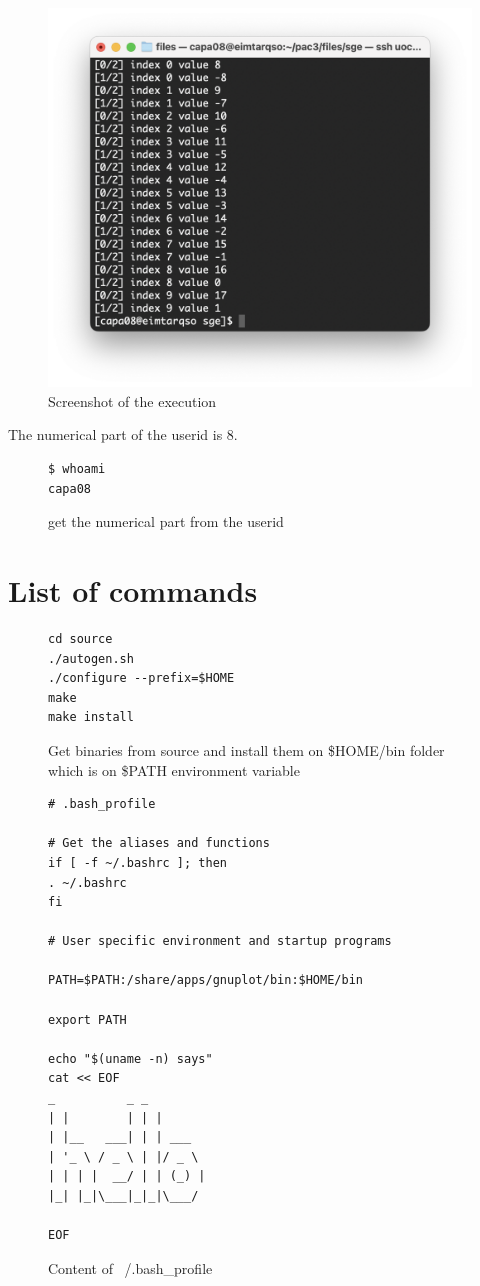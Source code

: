 \documentclass[12pt]{article}
\begin{document}
\begin{figure}[h!]
	\centering
	\includegraphics[width=0.6\linewidth]{images/Q4.png}
	\caption{Screenshot of the execution}
	\label{fig:scr04}
\end{figure}

The numerical part of the userid is 8.

\begin{figure}[h!]
	\begin{verbatim}
$ whoami 
capa08
	\end{verbatim}
	\caption{get the numerical part from the userid}\label{code:user}
\end{figure}

\newpage

\section*{List of commands}

\begin{figure}[h!]
	\begin{verbatim}
cd source
./autogen.sh 
./configure --prefix=$HOME
make
make install
	\end{verbatim}
	\caption{Get binaries from source and install them on \$HOME/bin folder which is on \$PATH environment variable}\label{code:build}
\end{figure}

\begin{figure}[h!]
	\begin{verbatim}
# .bash_profile

# Get the aliases and functions
if [ -f ~/.bashrc ]; then
. ~/.bashrc
fi

# User specific environment and startup programs

PATH=$PATH:/share/apps/gnuplot/bin:$HOME/bin

export PATH

echo "$(uname -n) says"
cat << EOF
_          _ _       
| |        | | |      
| |__   ___| | | ___  
| '_ \ / _ \ | |/ _ \ 
| | | |  __/ | | (_) |
|_| |_|\___|_|_|\___/ 

EOF
	\end{verbatim}
	\caption{Content of ~/.bash\_profile}\label{code:bashrc}
\end{figure}
\end{document}
